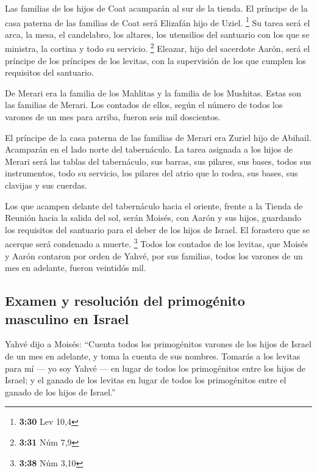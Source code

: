  Las familias de los hijos de Coat acamparán al sur de la
tienda.  El príncipe de la casa paterna de las familias
de Coat será Elizafán hijo de Uziel. \footnote{\textbf{3:30} Lev 10,4}
 Su tarea será el arca, la mesa, el candelabro, los
altares, los utensilios del santuario con los que se ministra, la
cortina y todo su servicio. \footnote{\textbf{3:31} Núm 7,9}
 Eleazar, hijo del sacerdote Aarón, será el príncipe de
los príncipes de los levitas, con la supervisión de los que cumplen los
requisitos del santuario.

 De Merari era la familia de los Mahlitas y la familia de
los Mushitas. Estas son las familias de Merari.  Los
contados de ellos, según el número de todos los varones de un mes para
arriba, fueron seis mil doscientos.

 El príncipe de la casa paterna de las familias de Merari
era Zuriel hijo de Abihail. Acamparán en el lado norte del tabernáculo.
 La tarea asignada a los hijos de Merari será las tablas
del tabernáculo, sus barras, sus pilares, sus bases, todos sus
instrumentos, todo su servicio,  los pilares del atrio
que lo rodea, sus bases, sus clavijas y sus cuerdas.

 Los que acampen delante del tabernáculo hacia el
oriente, frente a la Tienda de Reunión hacia la salida del sol, serán
Moisés, con Aarón y sus hijos, guardando los requisitos del santuario
para el deber de los hijos de Israel. El forastero que se acerque será
condenado a muerte. \footnote{\textbf{3:38} Núm 3,10} 
Todos los contados de los levitas, que Moisés y Aarón contaron por orden
de Yahvé, por sus familias, todos los varones de un mes en adelante,
fueron veintidós mil.

\hypertarget{examen-y-resoluciuxf3n-del-primoguxe9nito-masculino-en-israel}{%
\subsection{Examen y resolución del primogénito masculino en
Israel}\label{examen-y-resoluciuxf3n-del-primoguxe9nito-masculino-en-israel}}

 Yahvé dijo a Moisés: ``Cuenta todos los primogénitos
varones de los hijos de Israel de un mes en adelante, y toma la cuenta
de sus nombres.  Tomarás a los levitas para mí --- yo soy
Yahvé --- en lugar de todos los primogénitos entre los hijos de Israel;
y el ganado de los levitas en lugar de todos los primogénitos entre el
ganado de los hijos de Israel.''

